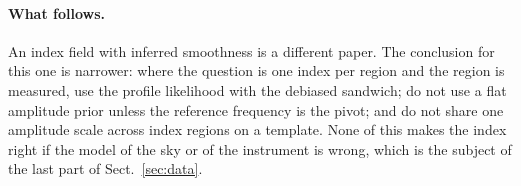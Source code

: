 \paragraph{What follows.} An index field with inferred smoothness is a different paper. The
conclusion for this one is narrower: where the question is one index per region and the region is
measured, use the profile likelihood with the debiased sandwich; do not use a flat amplitude prior
unless the reference frequency is the pivot; and do not share one amplitude scale across index
regions on a template. None of this makes the index right if the model of the sky or of the
instrument is wrong, which is the subject of the last part of Sect.~\ref{sec:data}.
